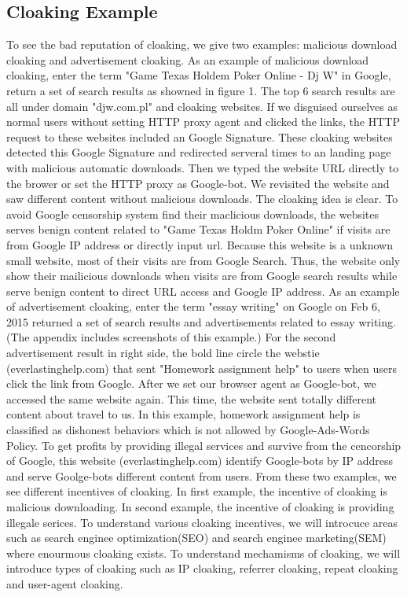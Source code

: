 \subsection{Cloaking Example}
To see the bad reputation of cloaking, we give two examples: malicious download cloaking and advertisement cloaking. As an example of malicious download cloaking, enter the term "Game Texas Holdem Poker Online - Dj W" in Google, return a set of search results as showned in figure 1.
The top 6 search results are all under domain "djw.com.pl" and cloaking websites. If we disguised ourselves as normal users without setting HTTP proxy agent and clicked the links, the HTTP request 
to these websites included an Google Signature. These cloaking websites detected this Google Signature and redirected serveral times to an landing page with malicious automatic downloads. Then we 
typed the website URL directly to the brower or set the HTTP proxy as Google-bot. We revisited the website and saw different content without malicious downloads. The cloaking idea is clear. To avoid Google censorship system find their maclicious downloads, the websites serves benign content related to "Game Texas Holdm Poker Online" if visits are from Google IP address or directly input url. Because this website is a unknown small website, most of their visits are from Google Search. Thus, the website only show their mailicious downloads when visits are from Google search results while serve benign content to direct URL access and Google IP address. 
As an example of advertisement cloaking, enter the term "essay writing" on Google on Feb 6, 2015 returned a set of search results and advertisements related to essay writing. (The appendix includes screenshots of this example.) For the second advertisement result in right side, the bold line circle the webstie (everlastinghelp.com) that sent "Homework assignment help" to users when users click the link from Google. After we set our browser agent as Google-bot, we accessed the same website again. This time, the website sent totally different content about travel to us. In this example, homework assignment help is classified as dishonest behaviors which is not allowed by Google-Ads-Words Policy. To get profits by providing illegal services and survive from the cencorship of Google, this website (everlastinghelp.com) identify Google-bots by IP address and serve Goolge-bots different content  from users. 
From these two examples, we see different incentives of cloaking. In first example, the incentive of cloaking is malicious downloading. In second example, the incentive of cloaking is providing 
illegale serices. To understand various cloaking incentives, we will introcuce areas such as search enginee optimization(SEO) and search enginee marketing(SEM) where enourmous cloaking exists. To understand 
mechamisms of cloaking, we will introduce types of cloaking such as IP cloaking, referrer cloaking, repeat cloaking and user-agent cloaking. 


